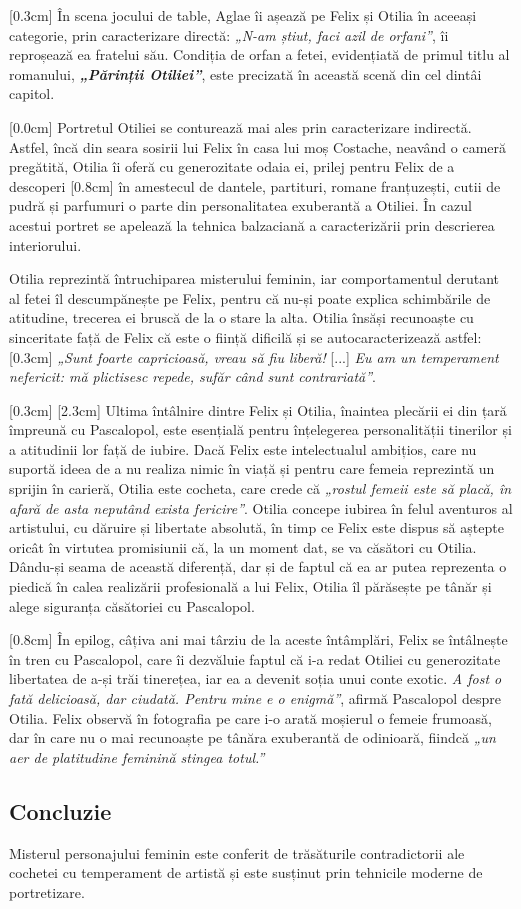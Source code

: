 \documentclass[
12pt,
a4paper
]{article}
\newcommand{\operainitialtitle}{\textbf{\textit{„Părinții Otiliei”}}} %
\begin{document}
[0.3cm]
În scena jocului de table, Aglae îi așează pe Felix și Otilia în aceeași categorie, prin caracterizare directă: \textit{„N-am știut, faci azil de orfani”}, îi reproșează ea fratelui său. Condiția de orfan a fetei, evidențiată de primul titlu al romanului, \operainitialtitle, este precizată în această scenă din cel dintâi capitol.

[0.0cm]
Portretul Otiliei se conturează mai ales prin caracterizare indirectă. Astfel, încă din seara sosirii lui Felix în casa lui moș Costache, neavând o cameră pregătită, Otilia îi oferă cu generozitate odaia ei, prilej pentru Felix de a descoperi
[0.8cm]
în amestecul de dantele, partituri, romane franțuzești, cutii de pudră și parfumuri o parte din personalitatea exuberantă a Otiliei. În cazul acestui portret se apelează la tehnica balzaciană a caracterizării prin descrierea interiorului.

Otilia reprezintă întruchiparea misterului feminin, iar comportamentul   derutant al fetei îl descumpănește pe Felix, pentru că nu-și poate explica schimbările de atitudine, trecerea ei bruscă de la o stare la alta. Otilia însăși recunoaște cu sinceritate față de Felix că este o ființă dificilă și se autocaracterizează astfel:
[0.3cm]
\textit{„Sunt foarte capricioasă, vreau să fiu liberă!} [...] \textit{Eu am un temperament nefericit: mă plictisesc repede, sufăr când sunt contrariată”}.

[0.3cm]
[2.3cm]
Ultima întâlnire dintre Felix și Otilia, înaintea plecării ei din țară împreună cu Pascalopol, este esențială pentru înțelegerea personalității tinerilor și a atitudinii lor față de iubire. Dacă Felix este intelectualul ambițios, care nu suportă ideea de a nu realiza nimic în viață și pentru care femeia reprezintă un sprijin în carieră, Otilia este cocheta, care crede că \textit{„rostul femeii este să placă, în afară de asta neputând exista fericire”}. Otilia concepe iubirea în felul aventuros al artistului, cu dăruire și libertate absolută, în timp ce Felix este dispus să aștepte oricât în virtutea promisiunii că, la un moment dat, se va căsători cu Otilia. Dându-și seama de această diferență, dar și de faptul că ea ar putea reprezenta o piedică în calea realizării profesională a lui Felix, Otilia îl părăsește pe tânăr și alege siguranța căsătoriei cu Pascalopol.

[0.8cm]
În epilog, câțiva ani mai târziu de la aceste întâmplări, Felix se întâlnește în tren cu Pascalopol, care îi dezvăluie faptul că i-a redat Otiliei cu generozitate libertatea de a-și trăi tinerețea, iar ea a devenit soția unui conte exotic. \textit{A fost o fată delicioasă, dar ciudată. Pentru mine e o enigmă”}, afirmă Pascalopol despre Otilia. Felix observă în fotografia pe care i-o arată moșierul o femeie frumoasă, dar în care nu o mai recunoaște pe tânăra exuberantă de odinioară, fiindcă \textit{„un aer de platitudine feminină stingea totul.”}

\subsection{Concluzie}

Misterul personajului feminin este conferit de trăsăturile contradictorii ale cochetei cu temperament de artistă și este susținut prin tehnicile moderne de portretizare.
\end{document}
